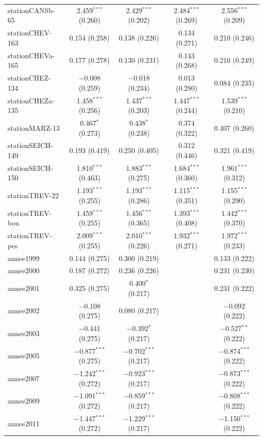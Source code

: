 \begin{table}[!htbp]
\begin{tabular}{@{\extracolsep{5pt}}lcccc}
  stationCANSb-65 & 2.459$^{***}$ (0.260) & 2.429$^{***}$ (0.202) & 2.484$^{***}$ (0.269) & 2.556$^{***}$ (0.209) \\ 
  stationCHEV-163 & 0.154 (0.258) & 0.138 (0.226) & 0.134 (0.271) & 0.210 (0.246) \\ 
  stationCHEVa-165 & 0.177 (0.278) & 0.130 (0.231) & 0.143 (0.268) & 0.210 (0.249) \\ 
  stationCHEZ-134 & $-$0.008 (0.259) & $-$0.018 (0.234) & 0.013 (0.280) & 0.084 (0.235) \\ 
  stationCHEZa-135 & 1.458$^{***}$ (0.256) & 1.437$^{***}$ (0.203) & 1.447$^{***}$ (0.244) & 1.539$^{***}$ (0.210) \\ 
  stationMARZ-13 & 0.467$^{*}$ (0.273) & 0.438$^{*}$ (0.238) & 0.374 (0.322) & 0.407 (0.260) \\ 
  stationSEICH-149 & 0.193 (0.419) & 0.250 (0.405) & 0.312 (0.446) & 0.321 (0.419) \\ 
  stationSEICH-150 & 1.810$^{***}$ (0.463) & 1.883$^{***}$ (0.275) & 1.684$^{***}$ (0.360) & 1.961$^{***}$ (0.312) \\ 
  stationTREV-22 & 1.193$^{***}$ (0.255) & 1.193$^{***}$ (0.286) & 1.115$^{***}$ (0.351) & 1.155$^{***}$ (0.290) \\ 
  stationTREV-bou & 1.459$^{***}$ (0.255) & 1.456$^{***}$ (0.365) & 1.393$^{***}$ (0.408) & 1.442$^{***}$ (0.370) \\ 
  stationTREV-pes & 2.009$^{***}$ (0.255) & 2.010$^{***}$ (0.226) & 1.932$^{***}$ (0.271) & 1.972$^{***}$ (0.233) \\ 
  annee1999 & 0.144 (0.275) & 0.300 (0.219) &  & 0.133 (0.222) \\ 
  annee2000 & 0.187 (0.272) & 0.236 (0.226) &  & 0.231 (0.230) \\ 
  annee2001 & 0.325 (0.275) & 0.400$^{*}$ (0.217) &  & 0.231 (0.222) \\ 
  annee2002 & $-$0.108 (0.275) & 0.080 (0.217) &  & $-$0.092 (0.222) \\ 
  annee2003 & $-$0.441 (0.275) & $-$0.392$^{*}$ (0.217) &  & $-$0.527$^{**}$ (0.222) \\ 
  annee2005 & $-$0.877$^{***}$ (0.275) & $-$0.702$^{***}$ (0.217) &  & $-$0.874$^{***}$ (0.222) \\ 
  annee2007 & $-$1.242$^{***}$ (0.272) & $-$0.923$^{***}$ (0.217) &  & $-$0.873$^{***}$ (0.222) \\ 
  annee2009 & $-$1.091$^{***}$ (0.272) & $-$0.859$^{***}$ (0.217) &  & $-$0.808$^{***}$ (0.222) \\ 
  annee2011 & $-$1.447$^{***}$ (0.272) & $-$1.229$^{***}$ (0.217) &  & $-$1.150$^{***}$ (0.222) \\ 

\end{tabular}
\end{table}
